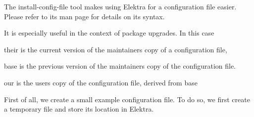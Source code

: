 The {\ttfamily install-\/config-\/file} tool makes using Elektra for a configuration file easier. Please refer to its man page for details on its syntax.

It is especially useful in the context of package upgrades. In this case


\begin{DoxyItemize}
\item {\ttfamily their} is the current version of the maintainer\textquotesingle{}s copy of a configuration file,
\item {\ttfamily base} is the previous version of the maintainer\textquotesingle{}s copy of the configuration file.
\item {\ttfamily our} is the user\textquotesingle{}s copy of the configuration file, derived from {\ttfamily base}
\end{DoxyItemize}

First of all, we create a small example configuration file. To do so, we first create a temporary file and store its location in Elektra.

